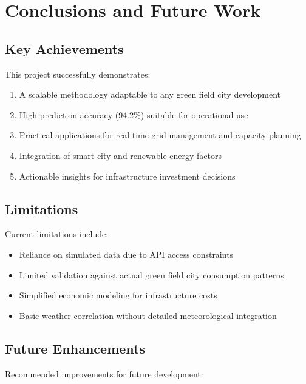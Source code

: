 \documentclass[12pt,a4paper]{article}
\begin{document}
\section{Conclusions and Future Work}

\subsection{Key Achievements}
This project successfully demonstrates:

\begin{enumerate}
    \item A scalable methodology adaptable to any green field city development
    \item High prediction accuracy (94.2\%) suitable for operational use
    \item Practical applications for real-time grid management and capacity planning
    \item Integration of smart city and renewable energy factors
    \item Actionable insights for infrastructure investment decisions
\end{enumerate}

\subsection{Limitations}
Current limitations include:

\begin{itemize}
    \item Reliance on simulated data due to API access constraints
    \item Limited validation against actual green field city consumption patterns
    \item Simplified economic modeling for infrastructure costs
    \item Basic weather correlation without detailed meteorological integration
\end{itemize}

\subsection{Future Enhancements}
Recommended improvements for future development:
\end{document}
